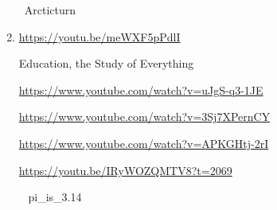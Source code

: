 \documentclass{article}%
\begin{document}
\begin{enumerate}
~Arcticturn

%
\item%
\href{https://youtu.be/meWXF5pPdlI}{https://youtu.be/meWXF5pPdlI}

Education, the Study of Everything

\href{https://www.youtube.com/watch?v=uJgS-q3-1JE}{https://www.youtube.com/watch?v=uJgS-q3-1JE}

\href{https://www.youtube.com/watch?v=3Sj7XPernCY}{https://www.youtube.com/watch?v=3Sj7XPernCY}

\href{https://www.youtube.com/watch?v=APKGHtj-2rI}{https://www.youtube.com/watch?v=APKGHtj-2rI}

\href{https://youtu.be/IRyWOZQMTV8?t=2069}{https://youtu.be/IRyWOZQMTV8?t=2069}

~ pi\_is\_3.14

%
\end{enumerate}

%
\end{document}
